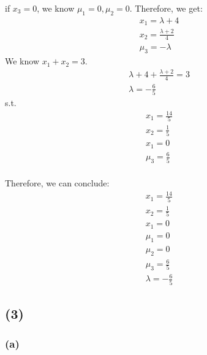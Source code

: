 \documentclass[12pt]{article}
\begin{document}
if \(x_3 = 0\), we know \(\mu_1 = 0, \mu_2 = 0\). Therefore, we get:
\begin{align*}
    x_1 = \lambda + 4 \\
    x_2 = \frac {\lambda + 2} {4} \\
    \mu_3 = -\lambda
\end{align*}
We know \(x_1 + x_2 = 3\).
\begin{align*}
    \lambda + 4 + \frac {\lambda + 2} {4} = 3 \\
    \lambda = -\frac{6}{5}
\end{align*}
s.t.
\begin{align*}
    x_1 = \frac{14}{5} \\
    x_2 = \frac{1}{5} \\
    x_1 = 0 \\
    \mu_3 = \frac{6}{5} \\
\end{align*}

Therefore, we can conclude:
\begin{align*}
    x_1 = \frac{14}{5} \\
    x_2 = \frac{1}{5} \\
    x_1 = 0 \\
    \mu_1 = 0 \\
    \mu_2 = 0 \\
    \mu_3 = \frac{6}{5} \\
    \lambda = -\frac{6}{5}
\end{align*}

\subsection{(3)}
\subsubsection{(a)}
\end{document}
